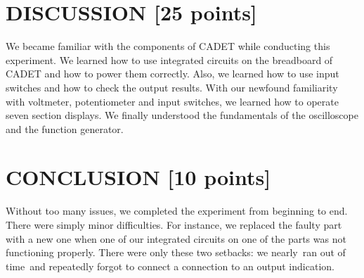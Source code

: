 \documentclass[pdftex,12pt,a4paper]{article}
\begin{document}
\section{DISCUSSION [25 points]}
We became familiar with the components of CADET while conducting this experiment. We learned how to use integrated circuits on the breadboard of CADET and how to power them correctly. Also, we learned how to use input switches and how to check the output results. With our newfound familiarity with voltmeter, potentiometer and input switches, we learned how to operate seven section displays. We finally understood the fundamentals of the oscilloscope and the function generator.

\section{CONCLUSION [10 points]}
Without too many issues, we completed the experiment from beginning to end. There were simply minor difficulties. For instance, we replaced the faulty part with a new one when one of our integrated circuits on one of the parts was not functioning properly. There were only these two setbacks: we nearly ran out of time and repeatedly forgot to connect a connection to an output indication.

\newpage
{}



\end{document}
